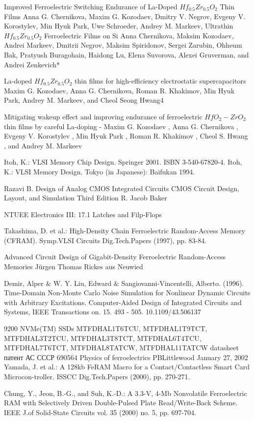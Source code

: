 \documentclass[a4paper,12pt]{article} %
\begin{document}
\begin{thebibliography}{}
      Improved Ferroelectric Switching Endurance of La-Doped $Hf_{0.5}Zr_{0.5}O_2$
Thin Films
Anna G. Chernikova, Maxim G. Kozodaev, Dmitry V. Negrov, Evgeny V. Korostylev,
Min Hyuk Park, Uwe Schroeder, Andrey M. Markeev,
	  Ultrathin $Hf_{0.5}Zr_{0.5}O_2$ Ferroelectric Films on Si
Anna Chernikova, Maksim Kozodaev, Andrei Markeev, Dmitrii Negrov, Maksim Spiridonov,
Sergei Zarubin, Ohheum Bak, Pratyush Buragohain, Haidong Lu, Elena Suvorova, Alexei Gruverman, and Andrei Zenkevich*

	 La-doped $Hf_{0.5}Zr_{0.5}O_2$ thin films for high-efficiency electrostatic supercapacitors 
Maxim G. Kozodaev, Anna G. Chernikova, Roman R. Khakimov, Min Hyuk Park,
Andrey M. Markeev, and Cheol Seong Hwang4

	 Mitigating wakeup effect and improving
endurance of ferroelectric $HfO_2-ZrO_2$ thin
films by careful La-doping - Maxim G. Kozodaev , Anna G. Chernikova , Evgeny V. Korostylev , Min Hyuk Park , Roman R.
Khakimov , Cheol S. Hwang , and Andrey M. Markeev

	 Itoh, K.: VLSI Memory Chip Design. Springer 2001. ISBN 3-540-67820-4.
	 Itoh, K.: VLSI Memory Design. Tokyo (in Japanese): Baifukan 1994.
	
	 Razavi B. Design of Analog CMOS Integrated Circuits 
	 CMOS Circuit Design, Layout, and Simulation Third Edition R. Jacob Baker

	 NTUEE Electronics III: 17.1 Latches and Filp-Flops


    Takashima, D. et al.: High-Density Chain Ferroelectric Random-Access Memory (CFRAM). Symp.VLSI Circuits Dig.Tech.Papers (1997), pp. 83-84.
   
    Advanced Circuit Design of
Gigabit-Density Ferroelectric
Random-Access Memories Jürgen Thomas Rickes aus Neuwied  

    Demir, Alper \& W. Y. Liu, Edward \& Sangiovanni-Vincentelli, Alberto. (1996). Time-Domain Non-Monte Carlo Noise Simulation for Nonlinear Dynamic Circuits with Arbitrary Excitations. Computer-Aided Design of Integrated Circuits and Systems, IEEE Transactions on. 15. 493 - 505. 10.1109/43.506137

	 9200 NVMe(TM) SSDs
MTFDHAL1T6TCU, MTFDHAL1T9TCT, MTFDHAL3T2TCU,
MTFDHAL3T8TCT, MTFDHAL6T4TCU, MTFDHAL7T6TCT,
MTFDHAL8TATCW, MTFDHAL11TATCW datasheet
      патент АС СССР 690564
	 Physics of ferroelectrics PBLittlewood January 27, 2002
	 Yamada, J. et al.: A 128kb FeRAM Macro for a Contact/Contactless Smart Card Microcon-troller. ISSCC Dig.Tech.Papers (2000), pp. 270-271.

	 Chung, Y., Jeon, B.-G., and Suh, K.-D.: A 3.3-V, 4-Mb Nonvolatile Ferroelectric RAM with Selectively Driven Double-Pulsed Plate Read/Write-Back Scheme. IEEE J.of Solid-State Circuits vol. 35 (2000) no. 5, pp. 697-704.

\end{thebibliography}
\end{document}
